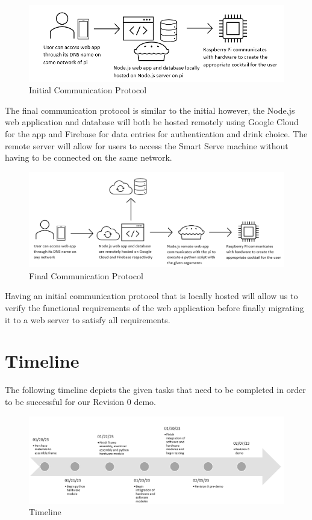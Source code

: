 \documentclass[12pt, titlepage]{article}
\begin{document}
\begin{figure}[H]
    \centerline{\includegraphics[scale=.5]{initialcommunicationprotocol.png}}
    \caption{Initial Communication Protocol}
    \label{fig}
\end{figure}

The final communication protocol is similar to the initial however, the Node.js web application and database will both be hosted remotely using Google Cloud for the app and Firebase for data entries for authentication and drink choice. The remote server will allow for users to access the Smart Serve machine without having to be connected on the same network.
\begin{figure}[H]
    \centerline{\includegraphics[scale=.5]{finalcommunicationprotocol.png}}
    \caption{Final Communication Protocol}
    \label{fig}
\end{figure}
Having an initial communication protocol that is locally hosted will allow us to verify the functional requirements of the web application before finally migrating it to a web server to satisfy all requirements. 

\section{Timeline}
The following timeline depicts the given tasks that need to be completed in order to be successful for our Revision 0 demo. 
\begin{figure}[H]
    \centerline{\includegraphics[scale=.5]{timeline.png}}
    \caption{Timeline}
    \label{fig}
\end{figure}
\end{document}
